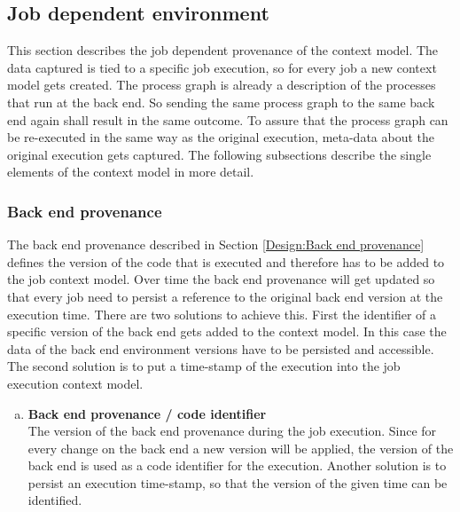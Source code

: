 \documentclass[draft,final]{vutinfth} %
\begin{document}
\subsection{Job dependent environment}\label{Design:Job dependent provenance}
This section describes the job dependent provenance of the context model. The data captured is tied to a specific job execution, so for every job a new context model gets created. The process graph is already a description of the processes that run at the back end. So sending the same process graph to the same back end again shall result in the same outcome. To assure that the process graph can be re-executed in the same way as the original execution, meta-data about the original execution gets captured. 
The following subsections describe the single elements of the context model in more detail. 

\subsubsection{Back end provenance}\label{Job:Back end provenance}
The back end provenance described in Section \ref{Design:Back end provenance} defines the version of the code that is executed and therefore has to be added to the job context model. Over time the back end provenance will get updated so that every job need to persist a reference to the original back end version at the execution time. There are two solutions to achieve this. First the identifier of a specific version of the back end gets added to the context model. In this case the data of the back end environment versions have to be persisted and accessible. The second solution is to put a time-stamp of the execution into the job execution context model.

\begin{enumerate}[(b)]
	\item \textbf{Back end provenance / code identifier} \\
	The version of the back end provenance during the job execution. Since for every change on the back end a new version will be applied, the version of the back end is used as a code identifier for the execution. Another solution is to persist an execution time-stamp, so that the version of the given time can be identified.
\end{enumerate}
\end{document}
